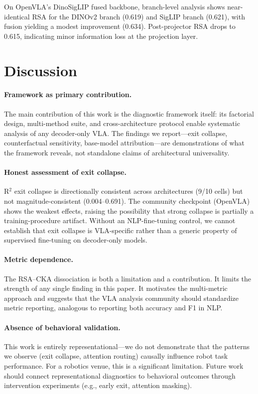 \documentclass[letterpaper]{article}
\begin{document}
On OpenVLA's DinoSigLIP fused backbone, branch-level analysis shows near-identical RSA for the DINOv2 branch (0.619) and SigLIP branch (0.621), with fusion yielding a modest improvement (0.634).
Post-projector RSA drops to 0.615, indicating minor information loss at the projection layer.

\section{Discussion}

\paragraph{Framework as primary contribution.}
The main contribution of this work is the diagnostic framework itself: its factorial design, multi-method suite, and cross-architecture protocol enable systematic analysis of any decoder-only VLA.
The findings we report---exit collapse, counterfactual sensitivity, base-model attribution---are demonstrations of what the framework reveals, not standalone claims of architectural universality.

\paragraph{Honest assessment of exit collapse.}
R$^2$ exit collapse is directionally consistent across architectures (9/10 cells) but not magnitude-consistent (0.004--0.691).
The community checkpoint (OpenVLA) shows the weakest effects, raising the possibility that strong collapse is partially a training-procedure artifact.
Without an NLP-fine-tuning control, we cannot establish that exit collapse is VLA-specific rather than a generic property of supervised fine-tuning on decoder-only models.

\paragraph{Metric dependence.}
The RSA--CKA dissociation is both a limitation and a contribution.
It limits the strength of any single finding in this paper.
It motivates the multi-metric approach and suggests that the VLA analysis community should standardize metric reporting, analogous to reporting both accuracy and F1 in NLP.

\paragraph{Absence of behavioral validation.}
This work is entirely representational---we do not demonstrate that the patterns we observe (exit collapse, attention routing) causally influence robot task performance.
For a robotics venue, this is a significant limitation.
Future work should connect representational diagnostics to behavioral outcomes through intervention experiments (e.g., early exit, attention masking).
\end{document}
